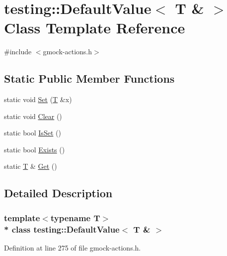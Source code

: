 \hypertarget{classtesting_1_1_default_value_3_01_t_01_6_01_4}{}\section{testing\+:\+:Default\+Value$<$ T \& $>$ Class Template Reference}
\label{classtesting_1_1_default_value_3_01_t_01_6_01_4}


{\ttfamily \#include $<$gmock-\/actions.\+h$>$}

\subsection*{Static Public Member Functions}
\begin{DoxyCompactItemize}
\item 
static void \hyperlink{classtesting_1_1_default_value_3_01_t_01_6_01_4_a9863abf3d311ce5007d7e57dfce2f252}{Set} (\hyperlink{functions__7_8js_adf1f3edb9115acb0a1e04209b7a9937b}{T} \&x)
\item 
static void \hyperlink{classtesting_1_1_default_value_3_01_t_01_6_01_4_a3c8f9f81e591370f9b33798f58ca1a10}{Clear} ()
\item 
static bool \hyperlink{classtesting_1_1_default_value_3_01_t_01_6_01_4_a3e61547c2f0141cc8004385f3a9c817d}{Is\+Set} ()
\item 
static bool \hyperlink{classtesting_1_1_default_value_3_01_t_01_6_01_4_a38420499e17d2fb4146ae6c4265f0d55}{Exists} ()
\item 
static \hyperlink{functions__7_8js_adf1f3edb9115acb0a1e04209b7a9937b}{T} \& \hyperlink{classtesting_1_1_default_value_3_01_t_01_6_01_4_a1310448dd8c171aecfcbf7c8df5de7bd}{Get} ()
\end{DoxyCompactItemize}


\subsection{Detailed Description}
\subsubsection*{template$<$typename T$>$\\*
class testing\+::\+Default\+Value$<$ T \& $>$}



Definition at line 275 of file gmock-\/actions.\+h.




